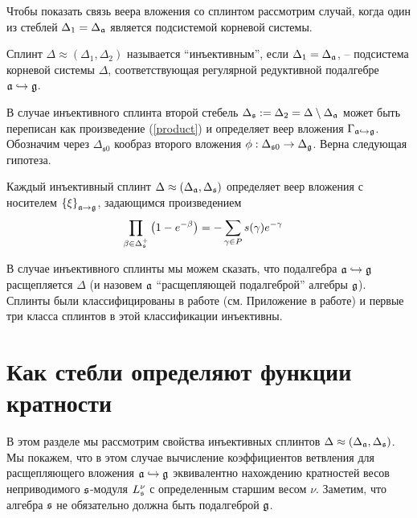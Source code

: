 Чтобы показать связь веера вложения со сплинтом рассмотрим случай, когда один из стеблей $\Delta _{1}=\Delta _{\mathfrak{a}}$  является подсистемой корневой системы. 

Сплинт $\Delta \approx (\Delta _{1},\Delta _{2})$ называется ``инъективным'', если $\Delta _{1}=\Delta _{\mathfrak{a}}$, -- подсистема корневой системы $\Delta $, соответствующая регулярной редуктивной подалгебре $\mathfrak{a}\hookrightarrow \mathfrak{g}$. 

В случае инъективного сплинта второй стебель $\Delta _{\frak{s}}:=\Delta_{2}=\Delta \setminus \Delta _{\mathfrak{a}}$ может быть переписан как произведение (\ref{product}) и определяет веер вложения  $\Gamma _{\mathfrak{a}\hookrightarrow \mathfrak{g}}$. Обозначим через $\Delta_{\mathfrak{s}0}$ кообраз второго вложения $\phi:\Delta_{\mathfrak{s}0}\to \Delta_{\mathfrak{g}}$. Верна следующая гипотеза.

\begin{Cnj}
Каждый инъективный сплинт $\Delta \approx (\Delta _{\mathfrak{a}},\Delta _{\frak{s}})$ определяет веер вложения с носителем $\left\{ \xi \right\} _{\mathfrak{a}\rightarrow \mathfrak{g}}$, задающимся произведением
\begin{equation}
\prod_{\beta \in \Delta _{\frak{s}}^{+}}\left( 1-e^{-\beta }\right)
=-\sum_{\gamma \in P}s(\gamma )e^{-\gamma }\quad   \label{splint product}
\end{equation}
\end{Cnj}

В случае инъективного сплинты мы можем сказать, что подалгебра $\mathfrak{a}\hookrightarrow \mathfrak{g}$ расщепляется $\Delta$ (и назовем $\mathfrak{a}$ ``расщепляющей подалгеброй'' алгебры $\mathfrak{g}$).  Сплинты были классифицированы в работе \cite{richter2008splints}  (см. Приложение в работе) и первые три класса сплинтов в этой классификации инъективны. 

\section{Как стебли определяют функции кратности}

\label{sec:stems and multiplicity functions}

В этом разделе мы рассмотрим свойства инъективных сплинтов $\Delta \approx (\Delta _{\mathfrak{a}},\Delta _{\frak{s}})$. Мы покажем, что в этом случае вычисление коэффициентов ветвления для расщепляющего вложения $\mathfrak{a}\hookrightarrow\mathfrak{g}$ эквивалентно нахождению кратностей весов неприводимого $\frak{s}$-модуля $L_{\frak{s}}^{\nu }$ с определенным старшим весом $\nu $. Заметим, что алгебра $\frak{s}$ не обязательно должна быть подалгеброй $\mathfrak{g}$.

